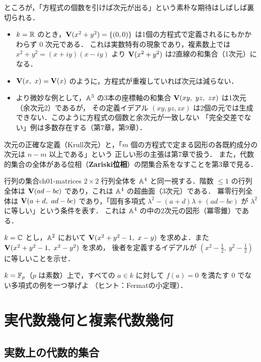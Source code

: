 ところが，「方程式の個数を引けば次元が出る」という素朴な期待はしばしば裏切られる．
\begin{itemize}
  \item $k=\mathbb{R}$ のとき，$\mathbf{V}(x^2+y^2)=\{(0,0)\}$ は1個の方程式で定義されるにもかかわらず $0$ 次元である．
        これは実数特有の現象であり，複素数上では $x^2+y^2=(x+iy)(x-iy)$ より $\mathbf{V}(x^2+y^2)$ は2直線の和集合（1次元）になる．
  \item $\mathbf{V}(x,\ x)=\mathbf{V}(x)$ のように，方程式が重複していれば次元は減らない．
  \item より微妙な例として，$\mathbb{A}^3$ の3本の座標軸の和集合 $\Zero(xy,\ yz,\ zx)$ は1次元（余次元2）であるが，
        その定義イデアル $(xy,yz,zx)$ は2個の元では生成できない．このように方程式の個数と余次元が一致しない
        「完全交差でない」例は多数存在する（第7章，第9章）．
\end{itemize}
次元の正確な定義（Krull次元）と，「$m$ 個の方程式で定まる図形の各既約成分の次元は $n-m$ 以上である」という
正しい形の主張は第7章で扱う．
また，代数的集合の全体がある位相（\textbf{Zariski位相}）の閉集合系をなすことを第3章で見る．

\begin{myex}{行列の集合}{ch01-matrices}
$2\times2$ 行列全体を $\mathbb{A}^4$ と同一視する．階数 $\le1$ の行列全体は $\mathbf{V}(ad-bc)$ であり，これは $\mathbb{A}^4$ の超曲面（3次元）である．
冪零行列全体は $\mathbf{V}(a+d,\ ad-bc)$ であり，「固有多項式 $\lambda^2-(a+d)\lambda+(ad-bc)$ が $\lambda^2$ に等しい」という条件を表す．
これは $\mathbb{A}^4$ の中の2次元の図形（冪零錐）である．
\end{myex}

$k=\mathbb{C}$ とし，$\mathbb{A}^2$ において $\mathbf{V}(x^2+y^2-1,\ x-y)$ を求めよ．また $\mathbf{V}(x^2+y^2-1,\ x^2-y^2)$ を求め，
後者を定義するイデアルが $(x^2-\tfrac12,\ y^2-\tfrac12)$ に等しいことを示せ．

$k=\mathbb{F}_p$（$p$ は素数）上で，すべての $a\in k$ に対して $f(a)=0$ を満たす $0$ でない多項式の例を一つ挙げよ
（ヒント：Fermatの小定理）．

\section{実代数幾何と複素代数幾何}

\subsection{実数上の代数的集合}

